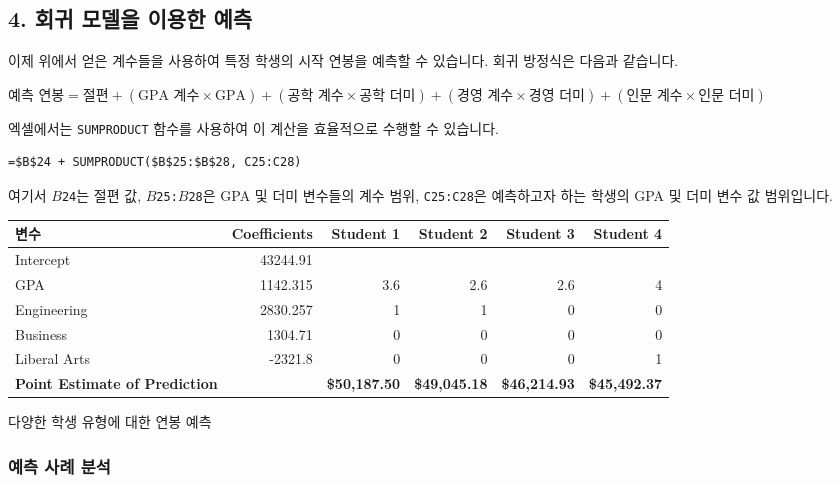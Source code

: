 \documentclass[11pt,a4paper]{article}
\theoremstyle{definition}
\begin{document}
\subsection{4. 회귀 모델을 이용한 예측}

이제 위에서 얻은 계수들을 사용하여 특정 학생의 시작 연봉을 예측할 수 있습니다. 회귀 방정식은 다음과 같습니다.

$\text{예측 연봉} = \text{절편} + (\text{GPA 계수} \times \text{GPA}) + (\text{공학 계수} \times \text{공학 더미}) + (\text{경영 계수} \times \text{경영 더미}) + (\text{인문 계수} \times \text{인문 더미})$

엑셀에서는 \texttt{SUMPRODUCT} 함수를 사용하여 이 계산을 효율적으로 수행할 수 있습니다.

\begin{lstlisting}[caption={엑셀 SUMPRODUCT 함수를 이용한 예측 공식}, label={lst:sumproduct_formula}]
=$B$24 + SUMPRODUCT($B$25:$B$28, C25:C28)
\end{lstlisting}
여기서 \texttt{$B$24}는 절편 값, \texttt{$B$25:$B$28}은 GPA 및 더미 변수들의 계수 범위, \texttt{C25:C28}은 예측하고자 하는 학생의 GPA 및 더미 변수 값 범위입니다.

\begin{adjustbox}{width=\textwidth,center}
\begin{tabular}{lrrrrr}
\toprule
\textbf{변수} & \textbf{Coefficients} & \textbf{Student 1} & \textbf{Student 2} & \textbf{Student 3} & \textbf{Student 4} \\
\midrule
Intercept & 43244.91 & & & & \\
GPA & 1142.315 & 3.6 & 2.6 & 2.6 & 4 \\
Engineering & 2830.257 & 1 & 1 & 0 & 0 \\
Business & 1304.71 & 0 & 0 & 0 & 0 \\
Liberal Arts & -2321.8 & 0 & 0 & 0 & 1 \\
\midrule
\textbf{Point Estimate of Prediction} & & \textbf{\$50,187.50} & \textbf{\$49,045.18} & \textbf{\$46,214.93} & \textbf{\$45,492.37} \\
\bottomrule
\end{tabular}
\caption{다양한 학생 유형에 대한 연봉 예측}
\label{tab:prediction_examples}
\end{adjustbox}

\subsubsection*{예측 사례 분석}
\end{document}
